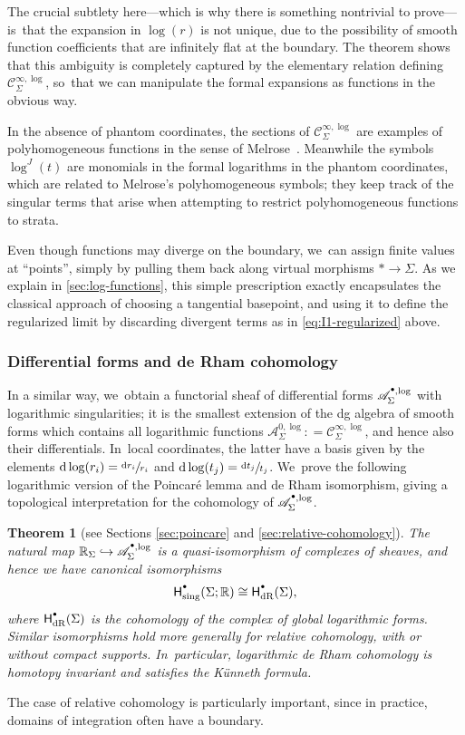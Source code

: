 \documentclass[JEP,XML,SOM,Unicode,NoFloatCountersInSection,published]{cedram}
\let\oldbullet\bullet
\renewcommand{\bullet}{{\raisebox{1pt}{$\scriptscriptstyle\oldbullet$}}}
\newcommand\hto{\mathrel{\lhook\joinrel\to}}
\newcommand{\dslog}[1]{\sfrac{\dd#1}{#1}}
\newtheorem{theorem}{Theorem}[section]
\theoremstyle{definition}
\theoremstyle{remark}
\newcommand{\RR}{\mathbb{R}}
\newcommand{\defas}{\mathrel{\mathop:}=}
\newcommand{\Cinflog}[1]{\mathscr{C}^{\infty,\log}_{#1}}
\newcommand{\dd}{\mathrm{d}}
\newcommand{\cAlog}[2][\bullet]{\mathscr{A}^{#1,\log}_{#2}}
\newcommand{\Sig}{\Sigma}
\newcommand{\HdR}[2][\bullet]{\mathsf{H}_{\mathrm{dR}}^{#1}(#2)}
\begin{document}
The crucial subtlety here---which is why there is something nontrivial to prove---is~that the expansion in $\log(r)$ is not unique, due to the possibility of smooth function coefficients that are infinitely flat at the boundary. The theorem shows that this ambiguity is completely captured by the elementary relation defining $\Cinflog{\Sig}$, so~that we can manipulate the formal expansions as functions in the obvious way.

In the absence of phantom coordinates, the sections of $\Cinflog{\Sig}$ are examples of polyhomogeneous functions in the sense of Melrose~\cite{Melrose1992}. Meanwhile the symbols $\log^J(t)$ are monomials in the formal logarithms in the phantom coordinates, which are related to Melrose's polyhomogeneous symbols; they keep track of the singular terms that arise when attempting to restrict polyhomogeneous functions to strata.

Even though functions may diverge on the boundary, we~can assign finite values at ``points'', simply by pulling them back along virtual morphisms $* \to \Sig$. As we explain in \autoref{sec:log-functions}, this simple prescription exactly encapsulates the classical approach of choosing a tangential basepoint, and using it to define the regularized limit by discarding divergent terms as in \eqref{eq:I1-regularized} above.

\subsubsection{Differential forms and de Rham cohomology}
In a similar way, we~obtain a functorial sheaf of differential forms $\cAlog{\Sig}$ with logarithmic singularities; it is the smallest extension of the dg algebra of smooth forms which contains all logarithmic functions $\cAlog[0]{\Sig} \defas \Cinflog{\Sig}$, and hence also their differentials. In~local coordinates, the latter have a basis given by the elements $\dd\log(r_i)=\dslog{r_i}$ and $\dd\log(t_j) = \dslog{t_j}$. We~prove the following logarithmic version of the Poincaré lemma and de Rham isomorphism, giving a topological interpretation for the cohomology of $\cAlog{\Sig}$.

\begin{theorem}[see Sections \ref{sec:poincare} and \ref{sec:relative-cohomology}]\label{thm:intro-deRham}
The natural map $\RR_{\Sig} \hto \cAlog{\Sig}$ is a quasi-isomorphism of complexes of sheaves, and hence we have canonical isomorphisms
\[
\mathsf{H}^\bullet_{\mathrm{sing}}(\Sig;\RR) \cong \HdR{\Sig},
\]
where $\HdR{\Sig}$ is the cohomology of the complex of global logarithmic forms. Similar isomorphisms hold more generally for relative cohomology, with or without compact supports. In~particular, logarithmic de Rham cohomology is homotopy invariant and satisfies the Künneth formula.
\end{theorem}
The case of relative cohomology is particularly important, since in practice, domains of integration often have a boundary.
\end{document}
